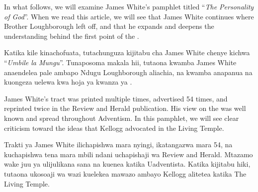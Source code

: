 



In what follows, we will examine James White’s pamphlet titled “\textit{The Personality of God}”. When we read this article, we will see that James White continues where Brother Loughborough left off, and that he expands and deepens the understanding behind the first point of the .


Katika kile kinachofuata, tutachunguza kijitabu cha James White chenye kichwa “\textit{Umbile la Mungu}”. Tunaposoma makala hii, tutaona kwamba James White anaendelea pale ambapo Ndugu Loughborough aliachia, na kwamba anapanua na kuongeza uelewa kwa hoja ya kwanza ya .


James White’s tract was printed multiple times, advertised 54 times, and reprinted twice in the Review and Herald publication. His view on the  was well known and spread throughout Adventism. In this pamphlet, we will see clear criticism toward the ideas that Kellogg advocated in the Living Temple.


Trakti ya James White ilichapishwa mara nyingi, ikatangazwa mara 54, na kuchapishwa tena mara mbili ndani uchapishaji wa Review and Herald. Mtazamo wake juu ya  ulijulikana sana na kuenea katika Uadventista. Katika kijitabu hiki, tutaona ukosoaji wa wazi kuelekea mawazo ambayo Kellogg alitetea katika The Living Temple.


